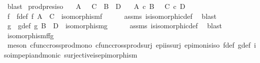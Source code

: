 \begin{isabellebody}
\ blast%
\endisatagproof
{\isafoldproof}%
%
\isadelimproof
\isanewline
%
\endisadelimproof
\isanewline
{}\isamarkupfalse%
\ prod{\isacharunderscore}{\kern0pt}pres{\isacharunderscore}{\kern0pt}iso{\isacharcolon}{\kern0pt}\isanewline
\ \ \ {\isachardoublequoteopen}A\ {\isasymcong}\ \ C{\isachardoublequoteclose}\ \ {\isachardoublequoteopen}B\ {\isasymcong}\ D{\isachardoublequoteclose}\isanewline
\ \ \ {\isachardoublequoteopen}A\ {\isasymtimes}\isactrlsub c\ B\ {\isasymcong}\ \ C\ {\isasymtimes}\isactrlsub c\ D{\isachardoublequoteclose}\isanewline
%
\isadelimproof
%
\endisadelimproof
%
\isatagproof
{}\isamarkupfalse%
\ {\isacharminus}{\kern0pt}\ \isanewline
\ \ \isamarkupfalse%
\ f\ \ f{\isacharunderscore}{\kern0pt}def{\isacharcolon}{\kern0pt}\ {\isachardoublequoteopen}f{\isacharcolon}{\kern0pt}\ A\ {\isasymrightarrow}\ C\ {\isasymand}\ isomorphism{\isacharparenleft}{\kern0pt}f{\isacharparenright}{\kern0pt}{\isachardoublequoteclose}\isanewline
\ \ \ \ \isamarkupfalse%
\ assms{\isacharparenleft}{\kern0pt}{}{\isacharparenright}{\kern0pt}\ is{\isacharunderscore}{\kern0pt}isomorphic{\isacharunderscore}{\kern0pt}def\ \isamarkupfalse%
\ blast\isanewline
\ \ \isamarkupfalse%
\ g\ \ g{\isacharunderscore}{\kern0pt}def{\isacharcolon}{\kern0pt}\ {\isachardoublequoteopen}g{\isacharcolon}{\kern0pt}\ B\ {\isasymrightarrow}\ D\ {\isasymand}\ isomorphism{\isacharparenleft}{\kern0pt}g{\isacharparenright}{\kern0pt}{\isachardoublequoteclose}\isanewline
\ \ \ \ \isamarkupfalse%
\ assms{\isacharparenleft}{\kern0pt}{}{\isacharparenright}{\kern0pt}\ is{\isacharunderscore}{\kern0pt}isomorphic{\isacharunderscore}{\kern0pt}def\ \isamarkupfalse%
\ blast\isanewline
\ \ \isamarkupfalse%
\ {\isachardoublequoteopen}isomorphism{\isacharparenleft}{\kern0pt}f{\isasymtimes}\isactrlsub fg{\isacharparenright}{\kern0pt}{\isachardoublequoteclose}\isanewline
\ \ \ \ \isamarkupfalse%
\ {\isacharparenleft}{\kern0pt}meson\ cfunc{\isacharunderscore}{\kern0pt}cross{\isacharunderscore}{\kern0pt}prod{\isacharunderscore}{\kern0pt}mono\ cfunc{\isacharunderscore}{\kern0pt}cross{\isacharunderscore}{\kern0pt}prod{\isacharunderscore}{\kern0pt}surj\ epi{\isacharunderscore}{\kern0pt}is{\isacharunderscore}{\kern0pt}surj\ epi{\isacharunderscore}{\kern0pt}mon{\isacharunderscore}{\kern0pt}is{\isacharunderscore}{\kern0pt}iso\ f{\isacharunderscore}{\kern0pt}def\ g{\isacharunderscore}{\kern0pt}def\ iso{\isacharunderscore}{\kern0pt}imp{\isacharunderscore}{\kern0pt}epi{\isacharunderscore}{\kern0pt}and{\isacharunderscore}{\kern0pt}monic\ surjective{\isacharunderscore}{\kern0pt}is{\isacharunderscore}{\kern0pt}epimorphism{\isacharparenright}{\kern0pt}\isanewline

\end{isabellebody}
